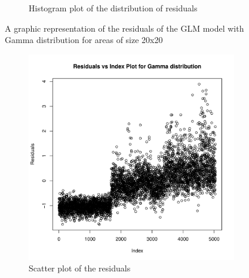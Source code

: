 \documentclass[12pt,a4paper,twoside]{article}
\begin{document}
\begin{figure}[!ht]
\begin{subfigure}{.45\textwidth}
        \caption{Histogram plot of the distribution of residuals}
        \label{fig:gammahist20}
    \end{subfigure}
    \caption{A graphic representation of the residuals of the GLM model with Gamma
    distribution for areas of size 20x20}
    \label{fig:gammafig20}
\end{figure}

\begin{figure}[!ht]
    \begin{subfigure}{.45\textwidth}
        \centering
        \includegraphics[width=\linewidth]{img/Gamma_distribution_40x40.pdf}
        \caption{Scatter plot of the residuals}
        \label{fig:gammascatter40}
    \end{subfigure}
    \begin{subfigure}{.45\textwidth}
        \centering

\end{subfigure}
\end{figure}
\end{document}
